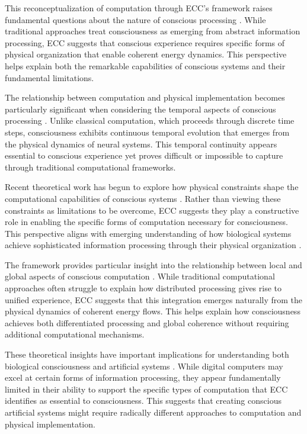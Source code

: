 This reconceptualization of computation through ECC's framework raises fundamental questions about the nature of conscious processing \cite{Wheeler1990}. While traditional approaches treat consciousness as emerging from abstract information processing, ECC suggests that conscious experience requires specific forms of physical organization that enable coherent energy dynamics. This perspective helps explain both the remarkable capabilities of conscious systems and their fundamental limitations.

The relationship between computation and physical implementation becomes particularly significant when considering the temporal aspects of conscious processing \cite{Deutsch2011}. Unlike classical computation, which proceeds through discrete time steps, consciousness exhibits continuous temporal evolution that emerges from the physical dynamics of neural systems. This temporal continuity appears essential to conscious experience yet proves difficult or impossible to capture through traditional computational frameworks.

Recent theoretical work has begun to explore how physical constraints shape the computational capabilities of conscious systems \cite{Fodor1981}. Rather than viewing these constraints as limitations to be overcome, ECC suggests they play a constructive role in enabling the specific forms of computation necessary for consciousness. This perspective aligns with emerging understanding of how biological systems achieve sophisticated information processing through their physical organization \cite{Smith2002}.

The framework provides particular insight into the relationship between local and global aspects of conscious computation \cite{vanGelder1995}. While traditional computational approaches often struggle to explain how distributed processing gives rise to unified experience, ECC suggests that this integration emerges naturally from the physical dynamics of coherent energy flows. This helps explain how consciousness achieves both differentiated processing and global coherence without requiring additional computational mechanisms.

These theoretical insights have important implications for understanding both biological consciousness and artificial systems \cite{Piccinini2015}. While digital computers may excel at certain forms of information processing, they appear fundamentally limited in their ability to support the specific types of computation that ECC identifies as essential to consciousness. This suggests that creating conscious artificial systems might require radically different approaches to computation and physical implementation.

